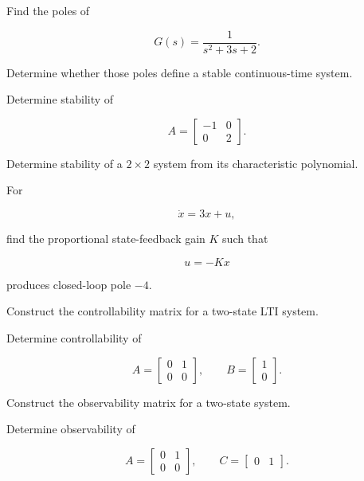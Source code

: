 \begin{exercise}[2]
Find the poles of

\[
G(s)
=
\frac{1}
{s^2+3s+2}.
\]
\end{exercise}

\begin{exercise}[2]
Determine whether those poles define a stable continuous-time system.
\end{exercise}

\begin{exercise}[2]
Determine stability of

\[
A
=
\begin{bmatrix}
-1 & 0\\
0 & 2
\end{bmatrix}.
\]
\end{exercise}

\begin{exercise}[3]
Determine stability of a \(2\times2\) system from its characteristic
polynomial.
\end{exercise}

\begin{exercise}[2]
For

\[
\dot{x}
=
3x+u,
\]

find the proportional state-feedback gain \(K\) such that

\[
u=-Kx
\]

produces closed-loop pole \(-4\).
\end{exercise}

\begin{exercise}[2]
Construct the controllability matrix for a two-state LTI system.
\end{exercise}

\begin{exercise}[3]
Determine controllability of

\[
A
=
\begin{bmatrix}
0 & 1\\
0 & 0
\end{bmatrix},
\qquad
B
=
\begin{bmatrix}
1\\
0
\end{bmatrix}.
\]
\end{exercise}

\begin{exercise}[2]
Construct the observability matrix for a two-state system.
\end{exercise}

\begin{exercise}[3]
Determine observability of

\[
A
=
\begin{bmatrix}
0 & 1\\
0 & 0
\end{bmatrix},
\qquad
C
=
\begin{bmatrix}
0 & 1
\end{bmatrix}.
\]
\end{exercise}

